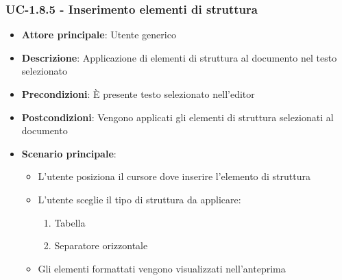 \documentclass[11pt,a4paper]{article}
\begin{document}
\subsubsection{UC-1.8.5 - Inserimento elementi di struttura}
\begin{itemize}
    \item \textbf{Attore principale}: Utente generico
    \item \textbf{Descrizione}: Applicazione di elementi di struttura al documento nel testo selezionato
    \item \textbf{Precondizioni}: È presente testo selezionato nell’editor
    \item \textbf{Postcondizioni}: Vengono applicati gli elementi di struttura selezionati al documento
    \item \textbf{Scenario principale}:
        \begin{itemize}
            \item L’utente posiziona il cursore dove inserire l’elemento di struttura
            \item L’utente sceglie il tipo di struttura da applicare:
                \begin{enumerate}
                    \item Tabella
                    \item Separatore orizzontale
                \end{enumerate}
            \item Gli elementi formattati vengono visualizzati nell'anteprima
        \end{itemize}
\end{itemize}
\end{document}

